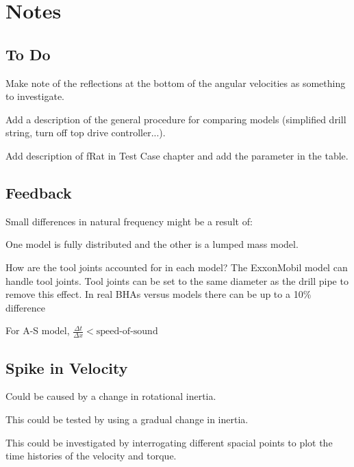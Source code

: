 \chapter{Notes}
\section{To Do}
\begin{bulletedlist}
	\item Make note of the reflections at the bottom of the angular velocities as something to investigate.
	\item Add a description of the general procedure for comparing models (simplified drill string, turn off top drive controller...).
    \item Add description of fRat in Test Case chapter and add the parameter in the table.
\end{bulletedlist}

\section{Feedback}
Small differences in natural frequency might be a result of:
\begin{bulletedlist}
	\item One model is fully distributed and the other is a lumped mass model.
	\item How are the tool joints accounted for in each model?  The ExxonMobil model can handle tool joints.  Tool joints can be set to the same diameter as the drill pipe to remove this effect.  In real BHAs versus models there can be up to a 10\% difference
	\item For A-S model, $\frac{\Delta t}{\Delta x} < \textrm{speed-of-sound}$
\end{bulletedlist}

\section{Spike in Velocity}
\begin{bulletedlist}
	\item Could be caused by a change in rotational inertia.
	\item This could be tested by using a gradual change in inertia.
	\item This could be investigated by interrogating different spacial points to plot the time histories of the velocity and torque.
\end{bulletedlist}

